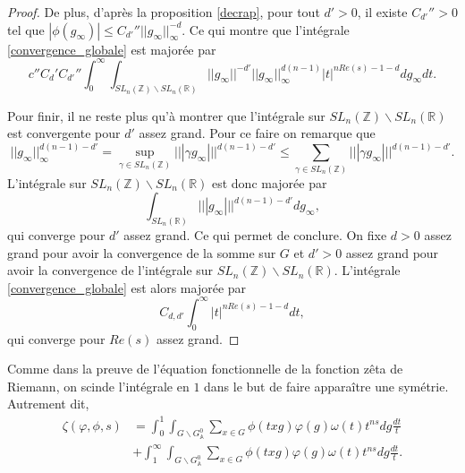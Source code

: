 \begin{proof}
De plus, d'après la proposition \ref{decrap}, pour tout $d' > 0$, il existe $C_{d'}'' > 0$ tel que $|\phi(g_\infty)| \leq C_{d'}'' ||g_\infty||^{-d}_\infty$. Ce qui montre que l'intégrale \ref{convergence_globale} est majorée par
\begin{equation}
c''C_d'C_{d'}''\int_0^\infty \int_{SL_n(\mathbb{Z}) \backslash SL_n(\mathbb{R})} ||g_\infty||^{-d'}||g_\infty||^{d(n-1)}_\infty|t|^{nRe(s)-1-d} dg_\infty dt.
\end{equation}

Pour finir, il ne reste plus qu'à montrer que l'intégrale sur $SL_n(\mathbb{Z}) \backslash SL_n(\mathbb{R})$ est convergente pour $d'$ assez grand. Pour ce faire on remarque que
\begin{equation}
||g_\infty||^{d(n-1)-d'}_\infty = \sup_{\gamma \in SL_n(\mathbb{Z})} |||\gamma g_\infty|||^{d(n-1)-d'} \leq \sum_{\gamma \in SL_n(\mathbb{Z})} |||\gamma g_\infty|||^{d(n-1)-d'}.
\end{equation}
L'intégrale sur $SL_n(\mathbb{Z}) \backslash SL_n(\mathbb{R})$ est donc majorée par
\begin{equation}
\int_{SL_n(\mathbb{R})} |||g_\infty|||^{d(n-1)-d'} dg_\infty,
\end{equation}
qui converge pour $d'$ assez grand. Ce qui permet de conclure. On fixe $d > 0$ assez grand pour avoir la convergence de la somme sur $G$ et $d' > 0$ assez grand pour avoir la convergence de l'intégrale sur $SL_n(\mathbb{Z}) \backslash SL_n(\mathbb{R})$. L'intégrale \ref{convergence_globale} est alors majorée par
\begin{equation}
C_{d,d'} \int_0^\infty |t|^{nRe(s)-1-d} dt,
\end{equation}
qui converge pour $Re(s)$ assez grand.
\end{proof}

Comme dans la preuve de l'équation fonctionnelle de la fonction zêta de Riemann, on scinde l'intégrale en $1$ dans le but de faire apparaître une symétrie. Autrement dit,
\begin{equation}
\begin{split}
\zeta(\varphi, \phi, s) &= \int_0^1 \int_{G \backslash G^0_\mathbb{A}} \sum_{x \in G}{\phi(txg)} \varphi(g) \omega(t) t^{ns} dg \frac{dt}{t} \\
&+ \int_1^\infty \int_{G \backslash G^0_\mathbb{A}} \sum_{x \in G}{\phi(txg)} \varphi(g) \omega(t) t^{ns} dg \frac{dt}{t}.
\end{split}
\end{equation}

